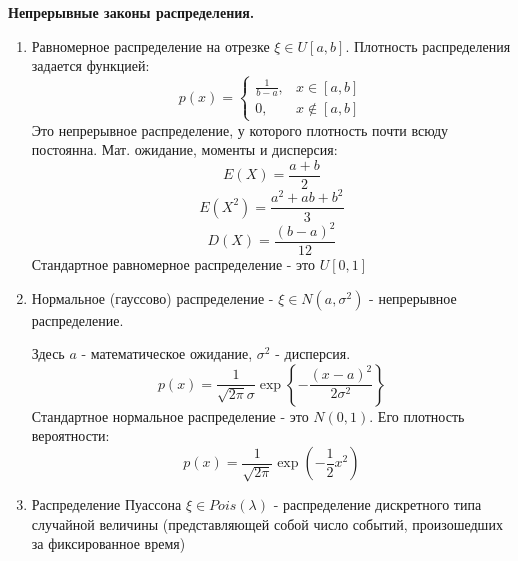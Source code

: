 \noindent \textbf{Непрерывные законы распределения.}
\begin{enumerate}
	\item Равномерное распределение на отрезке $\xi \in U[a, b]$. Плотность распределения задается функцией:
	\[
	p(x) =
	\begin{cases}
		\frac{1}{b-a}, &x \in [a, b] \\
		0, &x \notin [a, b]
	\end{cases}
	\]
	Это непрерывное распределение, у которого плотность почти всюду постоянна.
	Мат. ожидание, моменты и дисперсия:
	\[E(X)=\dfrac{a+b}{2}\]
	\[E(X^2)=\dfrac{a^2+ab+b^2}{3}\]
	\[D(X)=\dfrac{(b-a)^2}{12}\]
	Стандартное равномерное распределение - это $U[0,1]$
	\item Нормальное (гауссово) распределение - $\xi \in N(a, \sigma^2)$ - непрерывное распределение.

	Здесь $a$ - математическое ожидание, $ \sigma^2$ - дисперсия.
	\[ p(x) = \frac{1}{\sqrt{2 \pi} \sigma} \exp \left\{ - \frac{(x-a)^2}{2 \sigma^2} \right\} \]
	Стандартное нормальное распределение - это $N(0,1)$.
	Его плотность вероятности:
	\[ p(x) = \dfrac{1}{\sqrt{2\pi}}\exp(-\frac{1}{2}x^2)\]
	
	\item Распределение Пуассона $\xi \in Pois(\lambda)$ - распределение дискретного типа случайной величины (представляющей собой число событий, произошедших за фиксированное время)
	

\end{enumerate}
